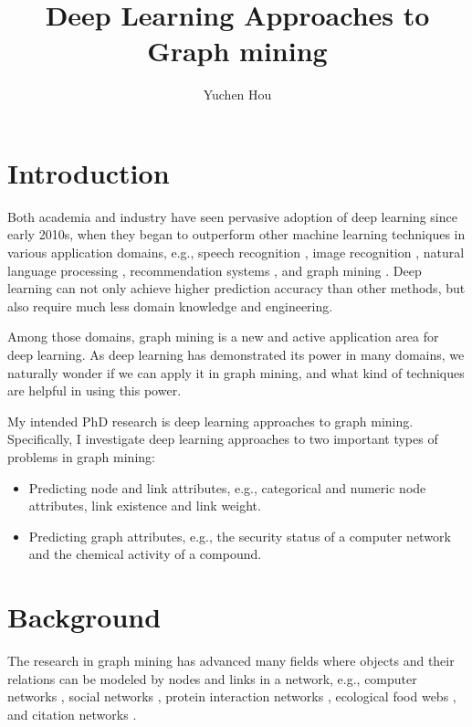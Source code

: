 \documentclass{article}
\begin{document}
	\title{Deep Learning Approaches to Graph mining}
	\author{Yuchen Hou}
	\maketitle

\section{Introduction}
Both academia and industry have seen pervasive adoption of deep learning since early 2010s,
when they began to outperform other machine learning techniques in various 
application domains, e.g.,
speech recognition \cite{hannun2014deep},
image recognition \cite{simonyan2014very},
natural language processing \cite{yao2013recurrent},
recommendation systems \cite{barkan2016item2vec},
and graph mining \cite{grovernode2vec}.
Deep learning can not only achieve higher prediction accuracy than other methods,
but also require much less domain knowledge and engineering.

Among those domains,
graph mining is a new and active application area for deep learning.
As deep learning has demonstrated its power in many domains,
we naturally wonder if we can apply it in graph mining,
and what kind of techniques are helpful in using this power.

My intended PhD research is deep learning approaches to graph mining.
Specifically, I investigate deep learning approaches to
two important types of problems in graph mining:
\begin{itemize}
	\item Predicting node and link attributes, e.g., categorical and numeric node attributes, link existence and link weight.
	\item Predicting graph attributes, e.g., the security status of a computer network and the chemical activity of a compound.
\end{itemize}

\section{Background}
The research in graph mining has advanced many fields
where objects and their relations can be modeled by nodes and links in a network, e.g.,
computer networks \cite{bermond1995distributed},
social networks \cite{cook2006mining},
protein interaction networks \cite{bader2003automated},
ecological food webs \cite{brown2003ecological},
and citation networks \cite{greenberg2009citation}.
\end{document}
